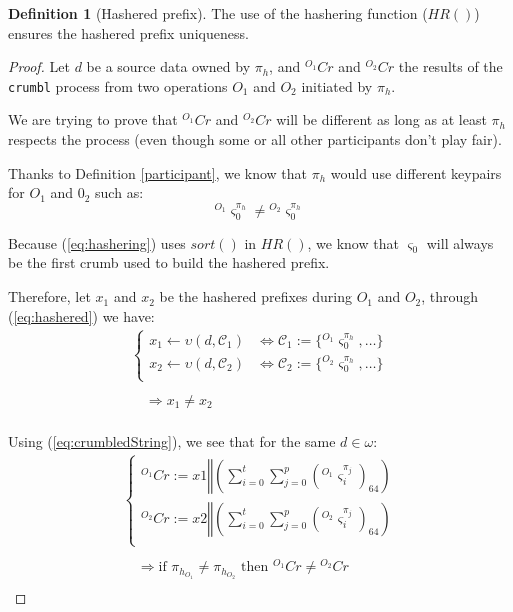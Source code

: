 \documentclass[twoside,twocolumn]{article}
\theoremstyle{definition}
\newtheorem{definition}{Definition}
\theoremstyle{remark}
\begin{document}
\begin{definition}[Hashered prefix]
    The use of the hashering function ($HR()$) ensures the hashered prefix uniqueness.

    \begin{proof}
        Let $d$ be a source data owned by $\pi_{h}$, and ${}^{O_1}Cr$ and ${}^{O_2}Cr$ the results of the \texttt{crumbl} process from two operations 
        $O_1$ and $O_2$ initiated by $\pi_h$.

        We are trying to prove that ${}^{O_1}Cr$ and ${}^{O_2}Cr$ will be different as long as at least $\pi_{h}$ respects the process (even though 
        some or all other participants don't play fair).

        Thanks to Definition \ref{participant}, we know that $\pi_h$ would use different keypairs for $O_1$ and $0_2$ such as:$$
            {}^{O_1}\varsigma_0^{\pi_h} \neq {}^{O_2}\varsigma_0^{\pi_h}
        $$

        Because (\ref{eq:hashering}) uses $sort()$ in $HR()$, we know that $\varsigma_0$ will always be the first crumb used to build the hashered 
        prefix.
        
        Therefore, let $x_1$ and $x_2$ be the hashered prefixes during $O_1$ and $O_2$, through (\ref{eq:hashered}) we have:$$
        \begin{array}{l}
            \left\{
                \begin{array}{ll}
                    x_1 \gets \upsilon(d, \mathcal{C}_1) &\iff \mathcal{C}_1 := \{ {}^{O_1}\varsigma_0^{\pi_h}, \dots \} \\
                    x_2 \gets \upsilon(d, \mathcal{C}_2) &\iff \mathcal{C}_2 := \{ {}^{O_2}\varsigma_0^{\pi_h}, \dots \} \\
                \end{array}
            \right. \\ \\
            \quad \Rightarrow x_1 \neq x_2 \\
            \end{array}
        $$
        
        Using (\ref{eq:crumbledString}), we see that for the same $d \in \omega$:$$
        \begin{array}{l}
            \left\{
                \begin{array}{l}
                    {}^{O_1}Cr := x1 \mathbin\Vert \left( \sum_{i=0}^t \sum_{j=0}^p ({}^{O_1}\varsigma_i^{\pi_j})_{64} \right) \\
                    {}^{O_2}Cr := x2 \mathbin\Vert \left( \sum_{i=0}^t \sum_{j=0}^p ({}^{O_2}\varsigma_i^{\pi_j})_{64} \right) \\
                \end{array}
            \right. \\ \\
            \quad \Rightarrow \textrm{if } \pi_{h_{O_1}} \neq \pi_{h_{O_2}} \textrm{ then } {}^{O_1}Cr \neq {}^{O_2}Cr \\
        \end{array}$$


\end{proof}
\end{definition}
\end{document}

